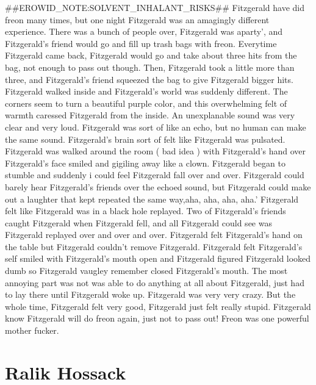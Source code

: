\documentclass[12pt]{book}
\begin{document}
\#\#EROWID\_NOTE:SOLVENT\_INHALANT\_RISKS\#\# Fitzgerald have did freon many times, but one night Fitzgerald was an amagingly different experience. There was a bunch of people over, Fitzgerald was aparty', and Fitzgerald's friend would go and fill up trash bags with freon. Everytime Fitzgerald came back, Fitzgerald would go and take about three hits from the bag, not enough to pass out though. Then, Fitzgerald took a little more than three, and Fitzgerald's friend squeezed the bag to give Fitzgerald bigger hits. Fitzgerald walked inside and Fitzgerald's world was suddenly different. The corners seem to turn a beautiful purple color, and this overwhelming felt of warmth caressed Fitzgerald from the inside. An unexplanable sound was very clear and very loud. Fitzgerald was sort of like an echo, but no human can make the same sound. Fitzgerald's brain sort of felt like Fitzgerald was pulsated. Fitzgerald was walked around the room ( bad idea ) with Fitzgerald's hand over Fitzgerald's face smiled and gigiling away like a clown. Fitzgerald began to stumble and suddenly i could feel Fitzgerald fall over and over. Fitzgerald could barely hear Fitzgerald's friends over the echoed sound, but Fitzgerald could make out a laughter that kept repeated the same way,aha, aha, aha, aha.' Fitzgerald felt like Fitzgerald was in a black hole replayed. Two of Fitzgerald's friends caught Fitzgerald when Fitzgerald fell, and all Fitzgerald could see was Fitzgerald replayed over and over and over. Fitzgerald felt Fitzgerald's hand on the table but Fitzgerald couldn't remove Fitzgerald. Fitzgerald felt Fitzgerald's self smiled with Fitzgerald's mouth open and Fitzgerald figured Fitzgerald looked dumb so Fitzgerald vaugley remember closed Fitzgerald's mouth. The most annoying part was not was able to do anything at all about Fitzgerald, just had to lay there until Fitzgerald woke up. Fitzgerald was very very crazy. But the whole time, Fitzgerald felt very good, Fitzgerald just felt really stupid. Fitzgerald know Fitzgerald will do freon again, just not to pass out! Freon was one powerful mother fucker.



\chapter{Ralik Hossack}
\end{document}
